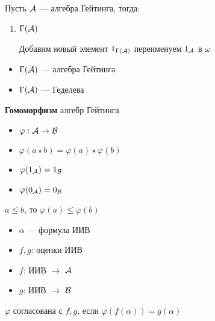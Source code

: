 \documentclass[oneside]{book}
\begin{document}
\begin{definition}
	Пусть \(\mathcal{A}\) --- алгебра Гейтинга, тогда:
	\begin{enumerate}
		\item \(\Gamma(\mathcal{A})\) \\
		      \begin{center}
		      \end{center}

		      Добавим новый элемент \(1_{\Gamma(\mathcal{A})}\) переименуем \(1_{\mathcal{A}}\) в  \(\omega\)
	\end{enumerate}
	\label{org18baaf0}
\end{definition}
\begin{theorem}
	\-
	\begin{itemize}
		\item \(\Gamma(\mathcal{A})\) --- алгебра Гейтинга
		\item \(\Gamma(\mathcal{A})\) --- Геделева
	\end{itemize}
	\label{org464e36f}
\end{theorem}
\begin{definition}
	\textbf{Гомоморфизм} алгебр Гейтинга \\
	\begin{itemize}
		\item \(\varphi: \mathcal{A} \to \mathcal{B}\)
		\item \(\varphi(a \star b) = \varphi(a)\star\varphi(b)\)
		\item \(\varphi(1_{\mathcal{A}}) = 1_{\mathcal{B}}\)
		\item \(\varphi(0_{\mathcal{A}}) = 0_{\mathcal{B}}\)
	\end{itemize}
	\label{org26668b6}
\end{definition}
\begin{theorem}
	\(a \le b\), то \(\varphi(a) \le \varphi(b)\)
	\label{org58b637a}
\end{theorem}
\begin{definition}
	\-
	\begin{itemize}
		\item \(\alpha\) --- формула ИИВ
		\item \(f, g\): оценки ИИВ
		\item \(f\): ИИВ \(\to\) \(\mathcal{A}\)
		\item \(g\): ИИВ \(\to\) \(\mathcal{B}\)
	\end{itemize}
	\(\varphi\) согласована с \(f, g\), если \(\varphi(f(\alpha)) = g(\alpha)\)
	\label{orge7c3a8f}
\end{definition}
\end{document}
